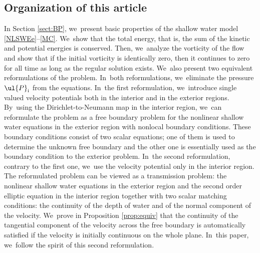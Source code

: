 \subsection{Organization of this article}
In Section \ref{sect:BP}, we~present basic properties of the shallow water model \eqref{NLSWEe}--\eqref{MC}. We~show that the total energy, that is, the sum of the kinetic and potential energies is conserved.
Then, we~analyze the vorticity of the flow and show that if the initial vorticity is identically zero,
then it continues to zero for all time as long as the regular solution exists. We~also present two equivalent reformulations of the problem. In~both reformulations, we~eliminate the pressure $\ul{P}_\mathrm{i}$ from the equations. In~the first reformulation, we~introduce single valued velocity potentials both in the interior and in the exterior regions. By~using the Dirichlet-to-Neumann map in the interior region, we~can reformulate the problem as a free boundary problem for the nonlinear shallow water equations
in the exterior region with nonlocal boundary conditions.
These boundary conditions consist of two scalar equations;
one of them is used to determine the unknown free boundary and the other one is essentially used as the boundary condition to the exterior problem. In~the second reformulation, contrary to the first one, we~use the velocity potential only in the interior region.
The reformulated problem can be viewed as a transmission problem:
the nonlinear shallow water equations in the exterior region and the second order elliptic equation in the interior region
together with two scalar matching conditions: the continuity of the depth of water and of the normal component of the velocity. We~prove in Proposition \ref{prop:equiv} that the continuity of the tangential component of the velocity across the free boundary is automatically satisfied
if the velocity is initially continuous on the whole plane. In~this paper, we~follow the spirit of this second reformulation.

